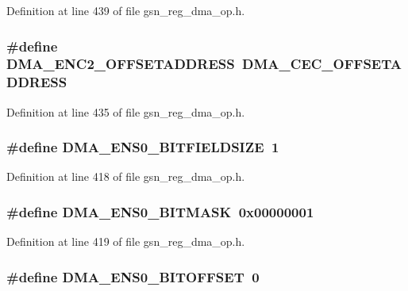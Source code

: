 Definition at line 439 of file gsn\_\-reg\_\-dma\_\-op.h.

\hypertarget{a00547_aff08d49030a7e049806294a7e7b64113}{
\subsubsection[{DMA\_\-ENC2\_\-OFFSETADDRESS}]{\setlength{\rightskip}{0pt plus 5cm}\#define DMA\_\-ENC2\_\-OFFSETADDRESS~DMA\_\-CEC\_\-OFFSETADDRESS}}
\label{a00547_aff08d49030a7e049806294a7e7b64113}


Definition at line 435 of file gsn\_\-reg\_\-dma\_\-op.h.

\hypertarget{a00547_ad852bf260d86a03c492dda890f706436}{
\subsubsection[{DMA\_\-ENS0\_\-BITFIELDSIZE}]{\setlength{\rightskip}{0pt plus 5cm}\#define DMA\_\-ENS0\_\-BITFIELDSIZE~1}}
\label{a00547_ad852bf260d86a03c492dda890f706436}


Definition at line 418 of file gsn\_\-reg\_\-dma\_\-op.h.

\hypertarget{a00547_a9c2795aef353c9f52ec90d1902a4b06c}{
\subsubsection[{DMA\_\-ENS0\_\-BITMASK}]{\setlength{\rightskip}{0pt plus 5cm}\#define DMA\_\-ENS0\_\-BITMASK~0x00000001}}
\label{a00547_a9c2795aef353c9f52ec90d1902a4b06c}


Definition at line 419 of file gsn\_\-reg\_\-dma\_\-op.h.

\hypertarget{a00547_a8c2ee451a3a83cc383f7b6df839e0e94}{
\subsubsection[{DMA\_\-ENS0\_\-BITOFFSET}]{\setlength{\rightskip}{0pt plus 5cm}\#define DMA\_\-ENS0\_\-BITOFFSET~0}}
\label{a00547_a8c2ee451a3a83cc383f7b6df839e0e94}


